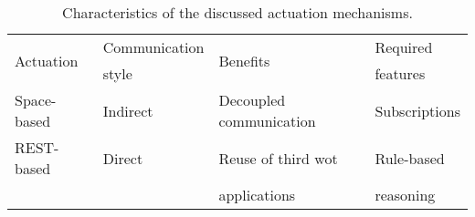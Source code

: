 
\begin{table}[htbp]
  \caption{Characteristics of the discussed actuation mechanisms.}
  \begin{center}
    \footnotesize
    \begin{tabular}{llll} 
      \hline
      \multirow{2}{*}{Actuation} &
      Communication & %
      \multirow{2}{*}{Benefits} &
      Required \\
      &
      style &
      ~ &
      features \\
      \hline
      Space-based & Indirect & Decoupled communication & Subscriptions \\[0.2cm]
      REST-based & Direct & Reuse of third \ac{wot} & Rule-based \\ %
      & & applications & reasoning \\ %
      \hline
    \end{tabular}
  \end{center}
  \label{tab:actuation_mechanisms}
\end{table}